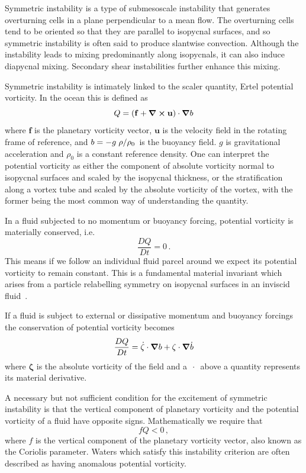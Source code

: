 Symmetric instability is a type of submesoscale instability that generates overturning cells in a plane perpendicular to a mean flow. The overturning cells tend to be oriented so that they are parallel to isopycnal surfaces, and so symmetric instability is often said to produce slantwise convection. Although the instability leads to mixing predominantly along isopycnals, it can also induce diapycnal mixing. Secondary shear instabilities further enhance this mixing.

Symmetric instability is intimately linked to the scaler quantity, Ertel potential vorticity. In the ocean this is defined as
\begin{equation}
    \label{eq:PVDefinition}
    Q = (\mathbf{f} + \curl{\mathbf{u}})\cdot\grad b    
\end{equation}
where $\mathbf{f}$ is the planetary vorticity vector, $\mathbf{u}$ is the velocity field in the rotating frame of reference, and $b = -  g \flatfrac{\rho}{\rho_0}$ is the buoyancy field. $g$ is gravitational acceleration and $\rho_0$ is a constant reference density. One can interpret the potential vorticity as either the component of absolute vorticity normal to isopycnal surfaces and scaled by the isopycnal thickness, or the stratification along a vortex tube and scaled by the absolute vorticity of the vortex, with the former being the most common way of understanding the quantity.

In a fluid subjected to no momentum or buoyancy forcing, potential vorticity is materially conserved, i.e.
\begin{equation}
    \frac{DQ}{Dt} = 0 \, .
\end{equation}
This means if we follow an individual fluid parcel around we expect its potential vorticity to remain constant. This is a fundamental material invariant which arises from a particle relabelling symmetry on isopycnal surfaces in an inviscid fluid~\citep{Salmon1998}.

If a fluid is subject to external or dissipative momentum and buoyancy forcings the conservation of potential vorticity  becomes
\begin{equation}
    \frac{DQ}{Dt} = \dot{\mathbf{\zeta}} \cdot  \grad{b} + \mathbf{\zeta} \cdot \grad{\dot{b}}
\end{equation}
where $\mathbf{\zeta}$ is the absolute vorticity of the field and a $\,\cdot{}\,$ above a quantity represents its material derivative.

A necessary but not sufficient condition for the excitement of symmetric instability is that the vertical component of planetary vorticity and the potential vorticity of a fluid have opposite signs. Mathematically we require that
\begin{equation}
    \label{eq:PVConservation}
    f Q < 0 \, ,
\end{equation}
where $f$ is the vertical component of the planetary vorticity vector, also known as the Coriolis parameter. Waters which satisfy this instability criterion are often described as having anomalous potential vorticity.

